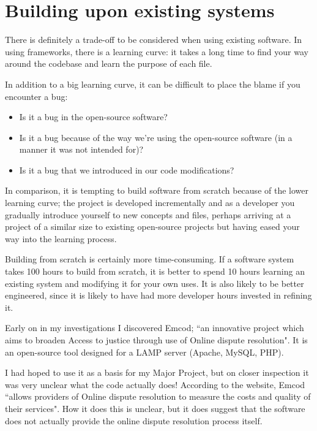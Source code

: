\chapter{Building upon existing systems}\label{appendix:buildingUponExistingSystems}

There is definitely a trade-off to be considered when using existing software. In using frameworks, there is a learning curve: it takes a long time to find your way around the codebase and learn the purpose of each file.

In addition to a big learning curve, it can be difficult to place the blame if you encounter a bug:

\begin{itemize}
\item Is it a bug in the open-source software?
\item Is it a bug because of the way we're using the open-source software (in a manner it was not intended for)?
\item Is it a bug that we introduced in our code modifications?
\end{itemize}

In comparison, it is tempting to build software from scratch because of the lower learning curve; the project is developed incrementally and as a developer you gradually introduce yourself to new concepts and files, perhaps arriving at a project of a similar size to existing open-source projects but having eased your way into the learning process.

Building from scratch is certainly more time-consuming. If a software system takes 100 hours to build from scratch, it is better to spend 10 hours learning an existing system and modifying it for your own uses. It is also likely to be better engineered, since it is likely to have had more developer hours invested in refining it.

Early on in my investigations I discovered Emcod; ``an innovative project which aims to broaden Access to justice through use of Online dispute resolution". It is an open-source tool designed for a LAMP server (Apache, MySQL, PHP).

I had hoped to use it as a basis for my Major Project, but on closer inspection it was very unclear what the code actually does! According to the website, Emcod ``allows providers of Online dispute resolution to measure the costs and quality of their services". How it does this is unclear, but it does suggest that the software does not actually provide the online dispute resolution process itself.


